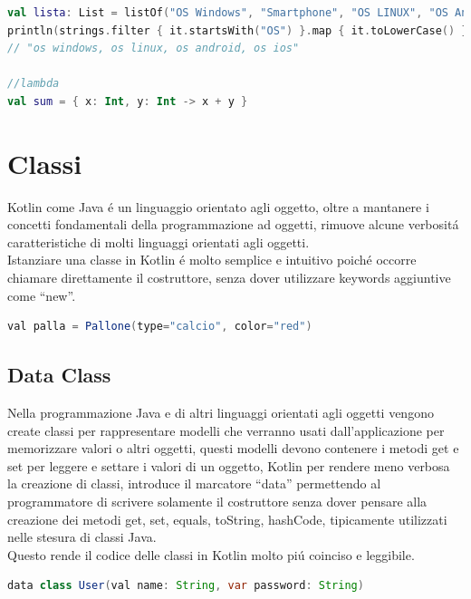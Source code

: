 \begin{lstlisting}[language=kotlin,caption={Esempio Kotlin Programmazione funzionale}]
val lista: List = listOf("OS Windows", "Smartphone", "OS LINUX", "OS Android", "RAM", "OS IOS", "Scarpe")
println(strings.filter { it.startsWith("OS") }.map { it.toLowerCase() }.joinToString())
// "os windows, os linux, os android, os ios"

//lambda
val sum = { x: Int, y: Int -> x + y }
\end{lstlisting}



\section{Classi}

Kotlin come Java \'e un linguaggio orientato agli oggetto, oltre a mantanere i concetti fondamentali della programmazione ad oggetti, rimuove alcune verbosit\'a caratteristiche di molti linguaggi orientati agli oggetti.\\
Istanziare una classe in Kotlin \'e molto semplice e intuitivo poich\'e occorre chiamare direttamente il costruttore, senza dover utilizzare keywords aggiuntive come ``new''.

\begin{lstlisting}[language=java,caption={Esempio class Kotlin}]
val palla = Pallone(type="calcio", color="red")
\end{lstlisting}



\subsection{Data Class}

Nella programmazione Java e di altri linguaggi orientati agli oggetti vengono create classi per rappresentare modelli che verranno usati dall'applicazione per memorizzare valori o altri oggetti, questi modelli devono contenere i metodi get e set per leggere e settare i valori di un oggetto, Kotlin per rendere meno verbosa la creazione di classi, introduce il marcatore ``data'' permettendo al programmatore di scrivere solamente il costruttore senza dover pensare alla creazione dei metodi get, set, equals, toString, hashCode, tipicamente utilizzati nelle stesura di classi Java.\\
Questo rende il codice delle classi in Kotlin molto pi\'u coinciso e leggibile.

\begin{lstlisting}[language=java,caption={Esempio dataclass Kotlin}]
data class User(val name: String, var password: String)
\end{lstlisting}

